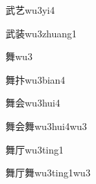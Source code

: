 \begin{verbete}[8;4]{武艺}{wu3yi4}
\end{verbete}

\begin{verbete}[8;12]{武装}{wu3zhuang1}
\end{verbete}

\begin{verbete}[14]{舞}{wu3}
\end{verbete}

\begin{verbete}[14;7]{舞抃}{wu3bian4}
\end{verbete}

\begin{verbete}[14;6]{舞会}{wu3hui4}
\end{verbete}

\begin{verbete}[14;6;14]{舞会舞}{wu3hui4wu3}
\end{verbete}

\begin{verbete}[14;4]{舞厅}{wu3ting1}
\end{verbete}

\begin{verbete}[14;4;14]{舞厅舞}{wu3ting1wu3}
\end{verbete}


